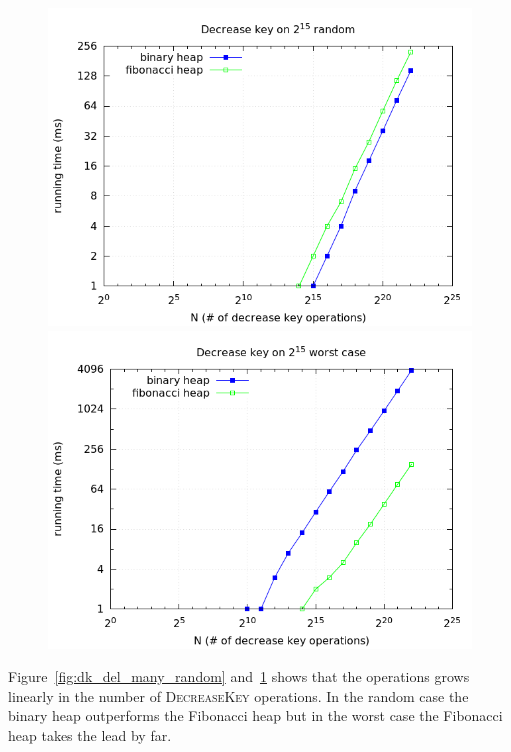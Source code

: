 \documentclass[a4paper,oneside,article,11pt]{memoir}
\begin{document}
\begin{figure}[H]
\centering
\begin{minipage}{0.48\columnwidth}
  \centering
  \includegraphics[width=\linewidth]{../res/dk/dk_random_fixed_size.png}%
  \caption{}
  \label{fig:dk_del_many_random}
\end{minipage}%
\hfill
\begin{minipage}{0.48\columnwidth}
  \centering
  \includegraphics[width=\linewidth]{../res/dk/dk_worst_fixed_size.png}%
  \caption{}
  \label{fig:dk_del_many_worst}
\end{minipage}
\end{figure}

Figure~\ref{fig:dk_del_many_random} and~\ref{fig:dk_del_many_worst} shows that the operations grows linearly in the number of \textsc{DecreaseKey} operations. In the random case the binary heap outperforms the Fibonacci heap but in the worst case the Fibonacci heap takes the lead by far.
\end{document}
